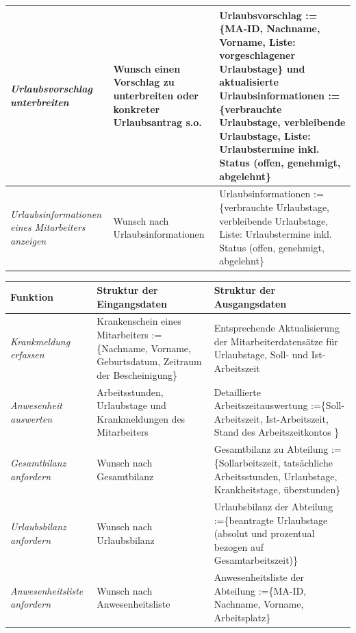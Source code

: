 {\begin{tabular}{|p{3cm}|p{6cm}|p{6cm}|}
	\hline
		\textit{Urlaubsvorschlag \newline unterbreiten} &
		Wunsch einen Vorschlag zu unterbreiten oder konkreter Urlaubsantrag s.o.&
		Urlaubsvorschlag := \{MA-ID, Nachname, Vorname, Liste: vorgeschlagener Urlaubstage\} und aktualisierte Urlaubsinformationen := \{verbrauchte Urlaubstage, verbleibende Urlaubstage, Liste: Urlaubstermine inkl. Status (offen, genehmigt, abgelehnt\}\\
	\hline
		\textit{Urlaubsinformationen eines Mitarbeiters an\-zeigen} &
		Wunsch nach Urlaubsinformationen &
		Urlaubsinformationen := \{verbrauchte Urlaubstage, verbleibende Urlaubstage, Liste: Urlaubstermine inkl. Status (offen, genehmigt, abgelehnt\}\\
	\hline
\end{tabular}
}

{
\hspace{-2cm}
\footnotesize
\begin{tabular}{|p{3cm}|p{6cm}|p{6cm}|}
	\hline
		\textbf{Funktion	} &
		\textbf{Struktur der Eingangsdaten} &
		\textbf{Struktur der Ausgangsdaten} \\
	\hline \hline
		\textit{Krankmeldung erfassen} &
		Krankenschein eines \newline Mitarbeiters := \{Nachname, Vorname, Geburtsdatum, Zeitraum der Bescheinigung\} &
		Entsprechende Aktualisierung der Mitarbeiterdatensätze für Urlaubstage, Soll- und Ist-Arbeitszeit \\
	\hline \hline
		\textit{Anwesenheit \newline auswerten} &
		Arbeitsstunden, Urlaubstage und Krankmeldungen des Mitarbeiters&
		Detaillierte Arbeitszeitauswertung :=\{Soll-Arbeitszeit, Ist-Arbeitszeit, Stand des Arbeitszeitkontos \} \\
	\hline \hline
		\textit{Gesamtbilanz \newline anfordern} &
		Wunsch nach Gesamtbilanz &
		Gesamtbilanz zu Abteilung :=\{Sollarbeitszeit, tatsächliche Arbeitsstunden, Urlaubstage, Krankheitstage, überstunden\}\\
	\hline
		\textit{Urlaubsbilanz \newline anfordern} &
		Wunsch nach Urlaubsbilanz&
		Urlaubsbilanz der Abteilung :=\{beantragte Urlaubstage (absolut und prozentual bezogen auf Gesamtarbeitszeit)\}\\
	\hline
		\textit{Anwesenheitsliste \newline anfordern} &
		Wunsch nach Anwesenheitsliste &
		Anwesenheitsliste der Abteilung :=\{MA-ID, Nachname, Vorname, Arbeitsplatz\} \\
	\hline
\end{tabular}
}


